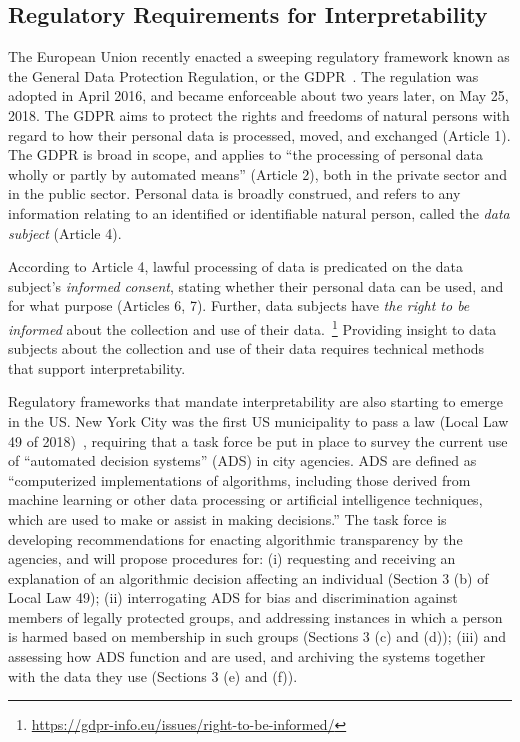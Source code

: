 \subsection{Regulatory Requirements for Interpretability}
\label{sec:intro:reg}

The European Union recently enacted a sweeping regulatory framework known as the General Data Protection Regulation, or the GDPR~\cite{gdpr}.  The regulation was adopted in April 2016, and became enforceable about two years later, on May 25, 2018.  The GDPR aims to protect the rights and freedoms of natural persons with regard to how their personal data is processed, moved, and exchanged (Article 1).  The GDPR is broad in scope, and applies to ``the processing of personal data wholly or partly by automated means'' (Article 2), both in the private sector and in the public sector.  Personal data is broadly construed, and refers to any information relating to an identified or identifiable natural person, called the {\em data subject} (Article 4).  

According to Article 4, lawful processing of data is predicated on the data subject's {\em informed consent}, stating whether their personal data can be used, and for what purpose (Articles 6, 7).
Further,  data subjects have {\em the right to be informed} about the collection and use of their data.~\footnote{\url{https://gdpr-info.eu/issues/right-to-be-informed/}}
Providing insight to data subjects about the collection and use of their data requires technical methods  that support interpretability.  

Regulatory frameworks that mandate interpretability are also starting to emerge in the US.  New York City was the first US municipality to pass a law (Local Law 49 of 2018)~\cite{Vacca}, requiring that a task force be put in place to survey the current use of ``automated decision systems'' (ADS) in city agencies. ADS are defined as ``computerized implementations of algorithms, including those derived from machine learning or other data processing or artificial intelligence techniques, which are used to make or assist in making decisions.''   The task force is developing recommendations for enacting algorithmic transparency by the agencies, and will propose procedures for: (i) requesting and receiving an explanation of an algorithmic decision affecting an individual (Section 3 (b) of Local Law 49); (ii) interrogating ADS for bias and discrimination against members of legally protected groups, and addressing instances in which a person is harmed based on membership in such groups (Sections 3 (c) and (d)); (iii) and assessing how ADS function and are used, and archiving the systems together with the data they use (Sections 3 (e) and (f)).


